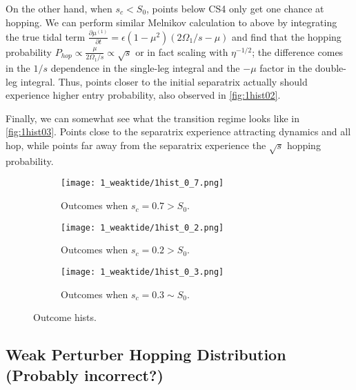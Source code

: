 \documentclass[11pt,
        usenames, %
        dvipsnames %
    ]{article}
\newcommand*{\pd}[2]{\frac{\partial#1}{\partial#2}}
\newcommand*{\p}[1]{\left(#1\right)}
\begin{document}
\begin{itemize}
        On the other hand, when $s_c < S_0$, points below CS4 only get one
        chance at hopping. We can perform similar Melnikov calculation to above
        by integrating the true tidal term $\pd{\mu^{(1)}}{t} = \epsilon\p{1 -
        \mu^2}\p{2\Omega_1/s - \mu}$ and find that the hopping probability
        $P_{hop} \propto \frac{\mu}{2\Omega_1/s} \propto \sqrt{s}$ or in fact
        scaling with $\eta^{-1/2}$; the difference comes in the $1/s$ dependence
        in the single-leg integral and the $-\mu$ factor in the double-leg
        integral. Thus, points closer to the initial separatrix actually should
        experience higher entry probability, also observed in
        \autoref{fig:1hist02}.

        Finally, we can somewhat see what the transition regime looks like in
        \autoref{fig:1hist03}. Points close to the separatrix experience
        attracting dynamics and all hop, while points far away from the
        separatrix experience the $\sqrt{s}$ hopping probability.
        \begin{figure}[t]
            \centering
            \begin{subfigure}{0.32\textwidth}
                \centering
                \texttt{[image: 1\_weaktide/1hist\_0\_7.png]}
                \caption{Outcomes when $s_c = 0.7 > S_0$.}\label{fig:1hist07}
            \end{subfigure}
            \begin{subfigure}{0.32\textwidth}
                \centering
                \texttt{[image: 1\_weaktide/1hist\_0\_2.png]}
                \caption{Outcomes when $s_c = 0.2 > S_0$.}\label{fig:1hist02}
            \end{subfigure}
            \begin{subfigure}{0.32\textwidth}
                \centering
                \texttt{[image: 1\_weaktide/1hist\_0\_3.png]}
                \caption{Outcomes when $s_c = 0.3 \sim S_0$.}\label{fig:1hist03}
            \end{subfigure}
            \caption{Outcome hists.}
        \end{figure}
\end{itemize}

\subsection{Weak Perturber Hopping Distribution (Probably incorrect?)}
\end{document}
